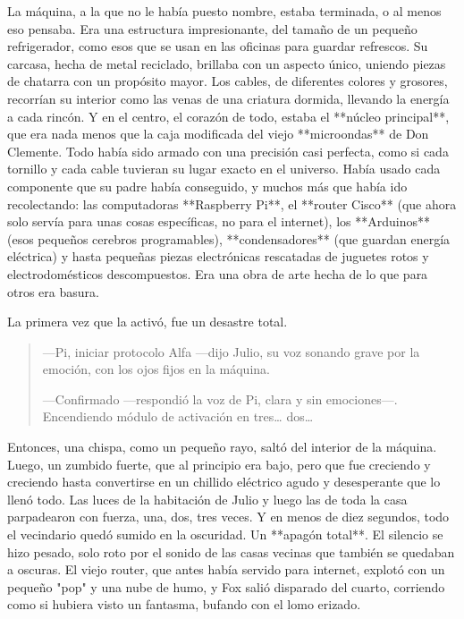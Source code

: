 \documentclass[a4paper,12pt]{book}
\begin{document}
La máquina, a la que no le había puesto nombre, estaba terminada, o al menos eso pensaba. Era una estructura impresionante, del tamaño de un pequeño refrigerador, como esos que se usan en las oficinas para guardar refrescos. Su carcasa, hecha de metal reciclado, brillaba con un aspecto único, uniendo piezas de chatarra con un propósito mayor. Los cables, de diferentes colores y grosores, recorrían su interior como las venas de una criatura dormida, llevando la energía a cada rincón. Y en el centro, el corazón de todo, estaba el **núcleo principal**, que era nada menos que la caja modificada del viejo **microondas** de Don Clemente. Todo había sido armado con una precisión casi perfecta, como si cada tornillo y cada cable tuvieran su lugar exacto en el universo. Había usado cada componente que su padre había conseguido, y muchos más que había ido recolectando: las computadoras **Raspberry Pi**, el **router Cisco** (que ahora solo servía para unas cosas específicas, no para el internet), los **Arduinos** (esos pequeños cerebros programables), **condensadores** (que guardan energía eléctrica) y hasta pequeñas piezas electrónicas rescatadas de juguetes rotos y electrodomésticos descompuestos. Era una obra de arte hecha de lo que para otros era basura.

La primera vez que la activó, fue un desastre total.

\begin{quote}
    —Pi, iniciar protocolo Alfa —dijo Julio, su voz sonando grave por la emoción, con los ojos fijos en la máquina.

    —Confirmado —respondió la voz de Pi, clara y sin emociones—. Encendiendo módulo de activación en tres… dos…
\end{quote}

Entonces, una chispa, como un pequeño rayo, saltó del interior de la máquina. Luego, un zumbido fuerte, que al principio era bajo, pero que fue creciendo y creciendo hasta convertirse en un chillido eléctrico agudo y desesperante que lo llenó todo. Las luces de la habitación de Julio y luego las de toda la casa parpadearon con fuerza, una, dos, tres veces. Y en menos de diez segundos, todo el vecindario quedó sumido en la oscuridad. Un **apagón total**. El silencio se hizo pesado, solo roto por el sonido de las casas vecinas que también se quedaban a oscuras. El viejo router, que antes había servido para internet, explotó con un pequeño "pop" y una nube de humo, y Fox salió disparado del cuarto, corriendo como si hubiera visto un fantasma, bufando con el lomo erizado.
\end{document}
